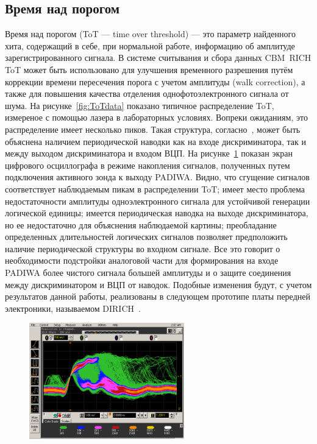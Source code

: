 \subsection{Время над порогом}\label{section:secToT}

Время над порогом (ToT --- time over threshold) --- это параметр найденного хита, содержащий в себе, при нормальной работе, информацию об амплитуде зарегистрированного сигнала. В системе считывания и сбора данных CBM~RICH ToT может быть использовано для улучшения временного разрешения путём коррекции времени пересечения порога с учетом амплитуды (walk correction), а также для повышения качества отделения однофотоэлектронного сигнала от шума. На рисунке~\ref{fig:ToTdata} показано типичное распределение ToT, измереное с помощью лазера в лабораторных условиях. Вопреки ожиданиям, это распределение имеет несколько пиков. Такая структура, согласно~\cite{ToTinNoise}, может быть объяснена наличием периодической наводки как на входе дискриминатора, так и между выходом дискриминатора и входом ВЦП. На рисунке~\ref{fig:ToTscope} показан экран цифрового осциллографа в режиме накопления сигналов, полученных путем подключения активного зонда к выходу PADIWA. Видно, что сгущение сигналов соответствует наблюдаемым пикам в распределении ToT; имеет место проблема недостаточности амплитуды одноэлектронного сигнала для устойчивой генерации логической единицы; имеется периодическая наводка на выходе дискриминатора, но ее недостаточно для объяснения наблюдаемой картины; преобладание определенных длительностей логических сигналов позволяет предположить наличие периодической структуры во входном сигнале. Все это говорит о необходимости подстройки аналоговой части для формирования на входе PADIWA более чистого сигнала большей амплитуды и о защите соединения между дискриминатором и ВЦП от наводок. Подобные изменения будут, с учетом результатов данной работы, реализованы в следующем прототипе платы передней электроники, называемом DIRICH~\cite{}.

\begin{figure}
\includegraphics[width=0.6\textwidth]{pictures/Scope_additional.png}
\caption{}
\label{fig:ToTscope}
\end{figure}

